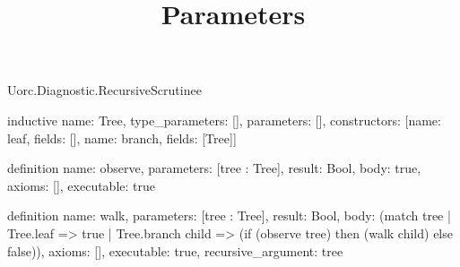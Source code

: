 \begin{lexlean}{Uorc.Diagnostic.RecursiveScrutinee}
\title{Parameters}
\begin{semanticmodule}
inductive{
  name: Tree,
  type_parameters: [],
  parameters: [],
  constructors: [{name: leaf, fields: []}, {name: branch, fields: [Tree]}]
}

definition{
  name: observe,
  parameters: [tree : Tree],
  result: Bool,
  body: true,
  axioms: [],
  executable: true
}

definition{
  name: walk,
  parameters: [tree : Tree],
  result: Bool,
  body: (match tree
    | Tree.leaf => true
    | Tree.branch child => (if (observe tree) then (walk child) else false)),
  axioms: [],
  executable: true,
  recursive_argument: tree
}
\end{semanticmodule}
\end{lexlean}

